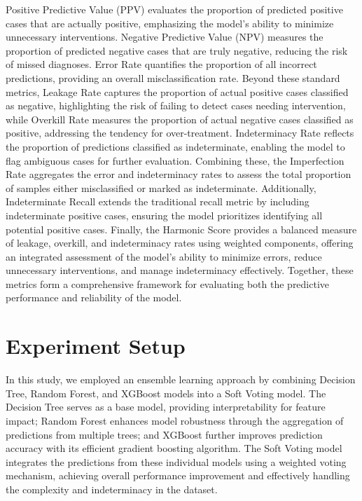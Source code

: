 Positive Predictive Value (PPV) evaluates the proportion of predicted positive cases that are actually positive, emphasizing the model’s ability to minimize unnecessary interventions. Negative Predictive Value (NPV) measures the proportion of predicted negative cases that are truly negative, reducing the risk of missed diagnoses. Error Rate quantifies the proportion of all incorrect predictions, providing an overall misclassification rate. Beyond these standard metrics, Leakage Rate captures the proportion of actual positive cases classified as negative, highlighting the risk of failing to detect cases needing intervention, while Overkill Rate measures the proportion of actual negative cases classified as positive, addressing the tendency for over-treatment. Indeterminacy Rate reflects the proportion of predictions classified as indeterminate, enabling the model to flag ambiguous cases for further evaluation. Combining these, the Imperfection Rate aggregates the error and indeterminacy rates to assess the total proportion of samples either misclassified or marked as indeterminate. Additionally, Indeterminate Recall extends the traditional recall metric by including indeterminate positive cases, ensuring the model prioritizes identifying all potential positive cases. Finally, the Harmonic Score provides a balanced measure of leakage, overkill, and indeterminacy rates using weighted components, offering an integrated assessment of the model’s ability to minimize errors, reduce unnecessary interventions, and manage indeterminacy effectively. Together, these metrics form a comprehensive framework for evaluating both the predictive performance and reliability of the model.

\section{Experiment Setup}

In this study, we employed an ensemble learning approach by combining Decision Tree, Random Forest, and XGBoost models into a Soft Voting model. The Decision Tree serves as a base model, providing interpretability for feature impact; Random Forest enhances model robustness through the aggregation of predictions from multiple trees; and XGBoost further improves prediction accuracy with its efficient gradient boosting algorithm. The Soft Voting model integrates the predictions from these individual models using a weighted voting mechanism, achieving overall performance improvement and effectively handling the complexity and indeterminacy in the dataset.

